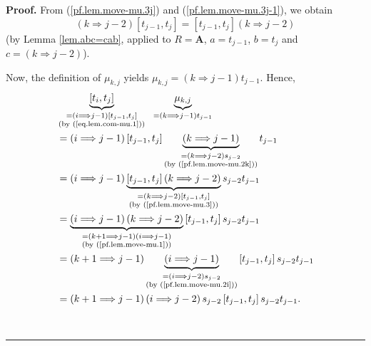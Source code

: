 \documentclass[numbers=enddot,12pt,final,onecolumn,notitlepage]{scrartcl}%
\theoremstyle{definition}
\newenvironment{proof}[1][Proof]{\noindent\textbf{#1.} }{\ \rule{0.5em}{0.5em}}
\begin{document}
\begin{proof}
From (\ref{pf.lem.move-mu.3j}) and (\ref{pf.lem.move-mu.3j-1}), we obtain%
\begin{equation}
\left(  k\Longrightarrow j-2\right)  \left[  t_{j-1},t_{j}\right]  =\left[
t_{j-1},t_{j}\right]  \left(  k\Longrightarrow j-2\right)
\label{pf.lem.move-mu.3}%
\end{equation}
(by Lemma \ref{lem.abc=cab}, applied to $R=\mathbf{A}$, $a=t_{j-1}$, $b=t_{j}$
and $c=\left(  k\Longrightarrow j-2\right)  $).

Now, the definition of $\mu_{k,j}$ yields $\mu_{k,j}=\left(  k\Longrightarrow
j-1\right)  t_{j-1}$. Hence,%
\begin{align}
&  \underbrace{\left[  t_{i},t_{j}\right]  }_{\substack{=\left(
i\Longrightarrow j-1\right)  \left[  t_{j-1},t_{j}\right]  \\\text{(by
(\ref{eq.lem.com-mu.1}))}}}\ \ \underbrace{\mu_{k,j}}_{=\left(
k\Longrightarrow j-1\right)  t_{j-1}}\nonumber\\
&  =\left(  i\Longrightarrow j-1\right)  \left[  t_{j-1},t_{j}\right]
\underbrace{\left(  k\Longrightarrow j-1\right)  }_{\substack{=\left(
k\Longrightarrow j-2\right)  s_{j-2}\\\text{(by (\ref{pf.lem.move-mu.2k}))}%
}}t_{j-1}\nonumber\\
&  =\left(  i\Longrightarrow j-1\right)  \underbrace{\left[  t_{j-1}%
,t_{j}\right]  \left(  k\Longrightarrow j-2\right)  }_{\substack{=\left(
k\Longrightarrow j-2\right)  \left[  t_{j-1},t_{j}\right]  \\\text{(by
(\ref{pf.lem.move-mu.3}))}}}s_{j-2}t_{j-1}\nonumber\\
&  =\underbrace{\left(  i\Longrightarrow j-1\right)  \left(  k\Longrightarrow
j-2\right)  }_{\substack{=\left(  k+1\Longrightarrow j-1\right)  \left(
i\Longrightarrow j-1\right)  \\\text{(by (\ref{pf.lem.move-mu.1}))}}}\left[
t_{j-1},t_{j}\right]  s_{j-2}t_{j-1}\nonumber\\
&  =\left(  k+1\Longrightarrow j-1\right)  \underbrace{\left(
i\Longrightarrow j-1\right)  }_{\substack{=\left(  i\Longrightarrow
j-2\right)  s_{j-2}\\\text{(by (\ref{pf.lem.move-mu.2i}))}}}\left[
t_{j-1},t_{j}\right]  s_{j-2}t_{j-1}\nonumber\\
&  =\left(  k+1\Longrightarrow j-1\right)  \left(  i\Longrightarrow
j-2\right)  s_{j-2}\left[  t_{j-1},t_{j}\right]  s_{j-2}t_{j-1}%
.\label{pf.lem.move-mu.5}%
\end{align}



\end{proof}
\end{document}
